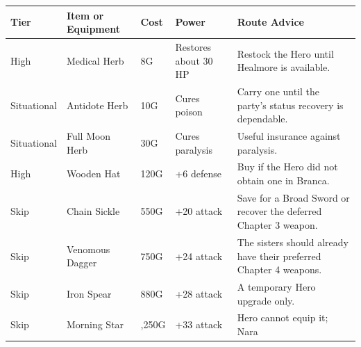 \documentclass[
  american,
  10pt,
  letterpaper,
  oneside,
  open=any]{scrreprt}
\newcounter{none} %
\newenvironment{guidetable}{%
  \small\setstretch{1.0}%
  \setlength{\tabcolsep}{4pt}%
  \setlength{\LTpre}{8pt}\setlength{\LTpost}{10pt}%
  \renewcommand{\arraystretch}{1.16}%
}{ }
\begin{document}
\begin{guidetable}

{\def\LTcaptype{none} %
\begin{longtable}[]{@{}
  >{\raggedright\arraybackslash}p{}
  >{\raggedright\arraybackslash}p{}
  >{\raggedleft\arraybackslash}p{}
  >{\raggedleft\arraybackslash}p{}
  >{\raggedright\arraybackslash}p{}@{}}
\toprule\noalign{}
\begin{minipage}[b]{\linewidth}\raggedright
\color{GuideGreen}\bfseries Tier
\end{minipage} & \begin{minipage}[b]{\linewidth}\raggedright
\color{GuideGreen}\bfseries Item or Equipment
\end{minipage} & \begin{minipage}[b]{\linewidth}\raggedleft
\color{GuideGreen}\bfseries Cost
\end{minipage} & \begin{minipage}[b]{\linewidth}\raggedleft
\color{GuideGreen}\bfseries Power
\end{minipage} & \begin{minipage}[b]{\linewidth}\raggedright
\color{GuideGreen}\bfseries Route Advice
\end{minipage} \\
\midrule\noalign{}
\endhead
\bottomrule\noalign{}
\endlastfoot
High & Medical Herb & 8G & Restores about 30 HP & Restock the Hero until
Healmore is available. \\
Situational & Antidote Herb & 10G & Cures poison & Carry one until the
party's status recovery is dependable. \\
Situational & Full Moon Herb & 30G & Cures paralysis & Useful insurance
against paralysis. \\
High & Wooden Hat & 120G & +6 defense & Buy if the Hero did not obtain
one in Branca. \\
Skip & Chain Sickle & 550G & +20 attack & Save for a Broad Sword or
recover the deferred Chapter 3 weapon. \\
Skip & Venomous Dagger & 750G & +24 attack & The sisters should already
have their preferred Chapter 4 weapons. \\
Skip & Iron Spear & 880G & +28 attack & A temporary Hero upgrade
only. \\
Skip & Morning Star & 1,250G & +33 attack & Hero cannot equip it; Nara

\end{longtable}}
\end{guidetable}
\end{document}
